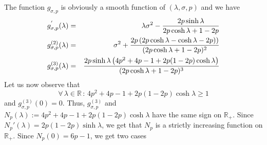 \documentclass[a4paper, 10pt]{article}
\newcommand{\beq}{\begin{equation}}
\newcommand{\eeq}{\end{equation}}
\newcommand{\bea}{\begin{eqnarray}}
\newcommand{\eea}{\end{eqnarray}}
\theoremstyle{definition}
\begin{document}
The function $g_{\sigma,p}$ is obviously a smooth function of $(\lambda,\sigma,p)$ and we have
\bea g^{'}_{\sigma,p}(\lambda)&=&\lambda \sigma^2 -\frac{2p\sinh \lambda }{2p\cosh \lambda +1-2p}\cr 
g^{(2)}_{\sigma,p}(\lambda)&=&\sigma^2+\frac{2p\left(2p\cosh \lambda -\cosh \lambda -2p)\right)}{(2p\cosh \lambda +1-2p)^2}\cr
g^{(3)}_{\sigma,p}(\lambda)&=&\frac{2p\sinh \lambda\left(4p^2+4p-1+2p(1-2p)\cosh \lambda\right) }{(2p\cosh \lambda +1-2p)^3}
\eea
Let us now observe that 
\beq \forall \, \lambda\in \mathbb{R} \,:\,4p^2+4p-1+2p(1-2p)\cosh \lambda\geq 1\eeq
and $g^{(3)}_{\sigma,p}(0)=0$. Thus, $g^{(3)}_{\sigma,p}$ and $N_{p}(\lambda):=4p^2+4p-1+2p(1-2p)\cosh \lambda$ have the same sign on $\mathbb{R}_+$. Since $N_{p}'(\lambda)=2p(1-2p)\sinh \lambda$, we get that $N_{p}$ is a strictly increasing function on $\mathbb{R}_+$. Since $N_{p}(0)=6p-1$, we get two cases
\end{document}
